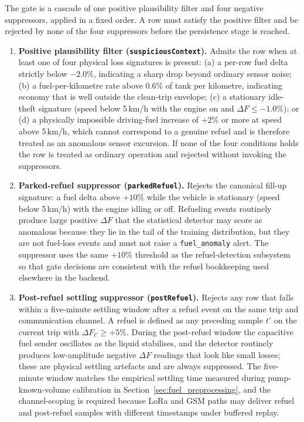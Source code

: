 The gate is a cascade of one positive plausibility filter and four negative suppressors, applied in a fixed order. A row must satisfy the positive filter and be rejected by none of the four suppressors before the persistence stage is reached.

\begin{enumerate}[label=\textbf{(\alph*)}, leftmargin=*]
    \item \textbf{Positive plausibility filter (\texttt{suspiciousContext}).} Admits the row when at least one of four physical loss signatures is present: (a) a per-row fuel delta strictly below $-2.0$\%, indicating a sharp drop beyond ordinary sensor noise; (b) a fuel-per-kilometre rate above $0.6$\% of tank per kilometre, indicating economy that is well outside the clean-trip envelope; (c) a stationary idle-theft signature (speed below 5\,km/h with the engine on and $\Delta F \leq -1.0$\%); or (d) a physically impossible driving-fuel increase of $+2$\% or more at speed above 5\,km/h, which cannot correspond to a genuine refuel and is therefore treated as an anomalous sensor excursion. If none of the four conditions holds the row is treated as ordinary operation and rejected without invoking the suppressors.

    \item \textbf{Parked-refuel suppressor (\texttt{parkedRefuel}).} Rejects the canonical fill-up signature: a fuel delta above $+10$\% while the vehicle is stationary (speed below 5\,km/h) with the engine idling or off. Refueling events routinely produce large positive $\Delta F$ that the statistical detector may score as anomalous because they lie in the tail of the training distribution, but they are not fuel-loss events and must not raise a \texttt{fuel\_anomaly} alert. The suppressor uses the same $+10$\% threshold as the refuel-detection subsystem so that gate decisions are consistent with the refuel bookkeeping used elsewhere in the backend.

    \item \textbf{Post-refuel settling suppressor (\texttt{postRefuel}).} Rejects any row that falls within a five-minute settling window after a refuel event on the same trip and communication channel. A refuel is defined as any preceding sample $t'$ on the current trip with $\Delta F_{t'} \geq +5$\%. During the post-refuel window the capacitive fuel sender oscillates as the liquid stabilises, and the detector routinely produces low-amplitude negative $\Delta F$ readings that look like small losses; these are physical settling artefacts and are always suppressed. The five-minute window matches the empirical settling time measured during pump-known-volume calibration in Section~\ref{sec:fuel_preprocessing}, and the channel-scoping is required because LoRa and GSM paths may deliver refuel and post-refuel samples with different timestamps under buffered replay.


\end{enumerate}

